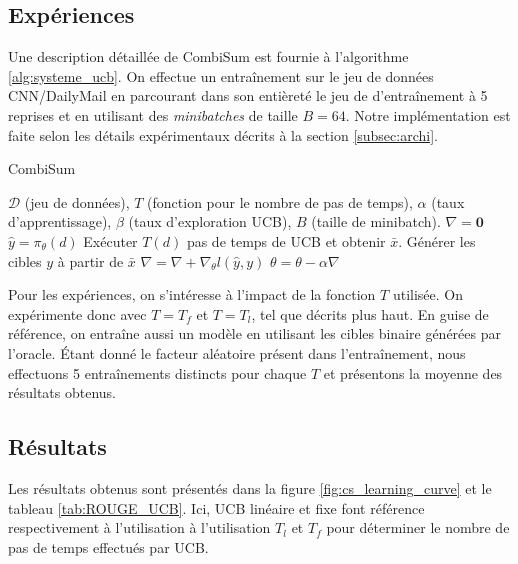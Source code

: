\subsection{Expériences}

Une description détaillée de CombiSum est fournie à l'algorithme \ref{alg:systeme_ucb}.
On effectue un entraînement sur le jeu de données CNN/DailyMail en 
parcourant dans son entièreté le jeu de d'entraînement à 5 reprises
et en utilisant des \textit{minibatches} de taille $B=64$.
Notre implémentation est faite selon les détails expérimentaux décrits à la section 
\ref{subsec:archi}.

\begin{algorithm}
    \caption{CombiSum}
    \begin{algorithmic}[1]
        \Require  $\mathcal{D}$ (jeu de données), $T$ (fonction pour le nombre de pas de temps), $\alpha$ (taux d'apprentissage), $\beta$ (taux d'exploration UCB), $B$ (taille de minibatch).
         
        \State $\nabla = \mathbf{0}$
        \State $\hat{y} = \pi_\theta(d)$
        \State Exécuter $T(d)$ pas de temps de UCB et obtenir $\bar{x}$.
        \State Générer les cibles $y$ à partir de $\bar{x}$ 
        \State $\nabla = \nabla + \nabla_\theta l(\hat{y}, y)$ 
        \EndFor
        \State $\theta = \theta - \alpha \nabla$
        \EndWhile
    \end{algorithmic}
    \label{alg:systeme_ucb}
\end{algorithm}

Pour les expériences, on s'intéresse à
l'impact de la fonction $T$ utilisée.
On expérimente donc avec $T = T_f$ et $T=T_l$,
tel que décrits plus haut.
En guise de référence, on entraîne aussi un modèle 
en utilisant les cibles binaire générées par l'oracle.
Étant donné le facteur aléatoire présent dans l'entraînement, nous effectuons 
5 entraînements distincts pour chaque $T$ et présentons la moyenne
des résultats obtenus.

\subsection{Résultats}

Les résultats obtenus sont présentés dans la figure \ref{fig:cs_learning_curve} 
et le tableau \ref{tab:ROUGE_UCB}.
Ici, UCB linéaire et fixe font référence respectivement à l'utilisation
à l'utilisation $T_l$ et $T_f$ pour déterminer le nombre de pas de temps
effectués par UCB.

